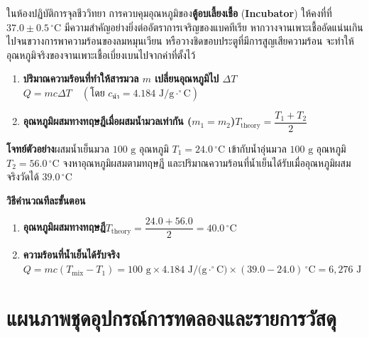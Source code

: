 ในห้องปฏิบัติการจุลชีววิทยา การควบคุมอุณหภูมิของ\textbf{ตู้อบเลี้ยงเชื้อ} (\textbf{Incubator}) ให้คงที่ที่ $37.0 \pm 0.5\,^\circ\text{C}$ มีความสำคัญอย่างยิ่งต่ออัตราการเจริญของแบคทีเรีย หากวางจานเพาะเชื้ออัดแน่นเกินไปจนขวางการพาความร้อนของลมหมุนเวียน หรือวางชิดขอบประตูที่มีการสูญเสียความร้อน จะทำให้อุณหภูมิจริงของจานเพาะเชื้อเบี่ยงเบนไปจากค่าที่ตั้งไว้

\begin{conceptbox}
\begin{enumerate}
    \item \textbf{ปริมาณความร้อนที่ทำให้สารมวล $m$ เปลี่ยนอุณหภูมิไป $\Delta T$}\quad $Q = m c \Delta T\quad (\text{โดย } c_{\text{น้ำ}} = 4.184\text{ J/g}\cdot^\circ\text{C})$
    \item \textbf{อุณหภูมิผสมทางทฤษฎีเมื่อผสมน้ำมวลเท่ากัน ($m_1 = m_2$)}\quad $T_{\text{theory}} = \dfrac{T_1 + T_2}{2}$
\end{enumerate}
\end{conceptbox}

\begin{worked}
\textbf{โจทย์ตัวอย่าง}\quad ผสมน้ำเย็นมวล $100\text{ g}$ อุณหภูมิ $T_1 = 24.0\,^\circ\text{C}$ เข้ากับน้ำอุ่นมวล $100\text{ g}$ อุณหภูมิ $T_2 = 56.0\,^\circ\text{C}$ จงหาอุณหภูมิผสมตามทฤษฎี และปริมาณความร้อนที่น้ำเย็นได้รับเมื่ออุณหภูมิผสมจริงวัดได้ $39.0\,^\circ\text{C}$

\textbf{วิธีคำนวณทีละขั้นตอน}
\begin{enumerate}
    \item \textbf{อุณหภูมิผสมทางทฤษฎี}\quad $T_{\text{theory}} = \dfrac{24.0 + 56.0}{2} = 40.0\,^\circ\text{C}$
    \item \textbf{ความร้อนที่น้ำเย็นได้รับจริง}\quad $Q = m c (T_{\text{mix}} - T_1) = 100\text{ g} \times 4.184\text{ J/(g}\cdot^\circ\text{C)} \times (39.0 - 24.0)\,^\circ\text{C} = 6{,}276\text{ J}$
\end{enumerate}
\end{worked}

\section{แผนภาพชุดอุปกรณ์การทดลองและรายการวัสดุ}

